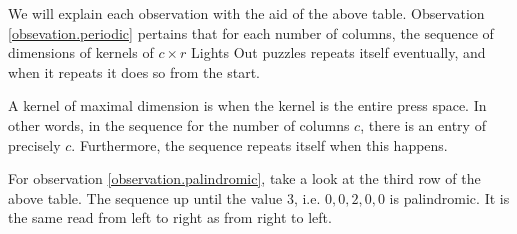 We will explain each observation with the aid of the above table.
Observation \ref{obsevation.periodic} pertains that for each number of columns, the sequence of dimensions of kernels
of $c\times r$ Lights Out puzzles repeats itself eventually, and when it repeats it does so from the start.

A kernel of maximal dimension is when the kernel is the entire press space. In other words, in the sequence for the number of columns $c$,
there is an entry of precisely $c$. Furthermore, the sequence repeats itself when this happens.

For observation \ref{observation.palindromic}, take a look at the third row of the above table. The sequence up until the value 3, i.e. $0, 0, 2, 0, 0$ is palindromic.
It is the same read from left to right as from right to left.




